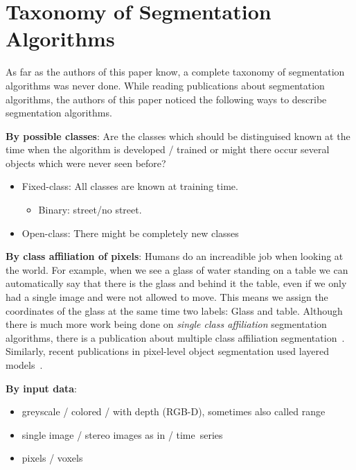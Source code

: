 \section{Taxonomy of Segmentation Algorithms}\label{sec:taxonomy}
As far as the authors of this paper know, a complete taxonomy of segmentation
algorithms was never done. While reading publications about segmentation
algorithms, the authors of this paper noticed the following ways to describe
segmentation algorithms.

\textbf{By possible classes}: Are the classes which should be distinguised
known at the time when the algorithm is developed / trained or might there
occur several objects which were never seen before?
\begin{itemize}
    \item Fixed-class: All classes are known at training time.
          \begin{itemize}
              \item Binary: street/no street.
          \end{itemize}
    \item Open-class: There might be completely new classes
\end{itemize}

\textbf{By class affiliation of pixels}: Humans do an increadible job when
looking at the world. For example, when we see a glass of water standing on a
table we can automatically say that there is the glass and behind it the table,
even if we only had a single image and were not allowed to move. This means we
assign the coordinates of the glass at the same time two labels: Glass and
table. Although there is much more work being done on \textit{single class
affiliation} segmentation algorithms, there is a publication about multiple
class affiliation segmentation~\cite{levin2008spectral}. Similarly, recent
publications in pixel-level object segmentation used layered
models~\cite{yang2012layered}.

\textbf{By input data}:
\begin{itemize}
    \item greyscale / colored / with depth (RGB-D), sometimes also called
          range~\cite{hoover1996experimental}
    \item single image / stereo images as in \cite{boykov2001fast} /
          time~series
    \item pixels / voxels \cite{wolz2012multi}
\end{itemize}

